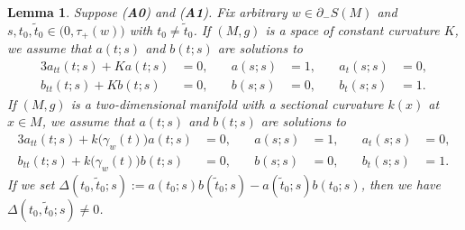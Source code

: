 \documentclass[a4paper,11pt,reqno]{amsart}
\numberwithin{equation}{section}
\newtheorem{lemma}[theorem]{Lemma}
\theoremstyle{definition}
\theoremstyle{remark}
\begin{document}
\begin{lemma}
\label{theorem:noconjugatepoint}
Suppose {\rm ({\bf A0})} and {\rm ({\bf A1})}. 
Fix arbitrary $w \in \partial_-S(M)$ and 
$s,t_0,\tilde{t}_0 \in \bigl(0,\tau_+(w)\bigr)$ 
with $t_0{\ne}\tilde{t}_0$. 
If $(M,g)$ is a space of constant curvature $K$, 
we assume that $a(t;s)$ and $b(t;s)$ are solutions to 
%
%
\begin{alignat}{3}
  a_{tt}(t;s)+Ka(t;s)
& =
  0,
& \quad 
  a(s;s)
& =
  1,
& \quad
  a_t(s;s)
& =
  0,
\label{equation:aK}
\\
  b_{tt}(t;s)+Kb(t;s)
& =
  0,
& \quad 
  b(s;s)
& =
  0,
& \quad
  b_t(s;s)
& =
  1. 
\label{equation:bK}
\end{alignat}
%
%  
If $(M,g)$ is a two-dimensional manifold 
with a sectional curvature $k(x)$ at $x \in M$, 
we assume that $a(t;s)$ and $b(t;s)$ are solutions to 
%
%
\begin{alignat}{3}
  a_{tt}(t;s)+k\bigl(\gamma_w(t)\bigr)a(t;s)
& =
  0,
& \quad 
  a(s;s)
& =
  1,
& \quad
  a_t(s;s)
& =
  0,
\label{equation:akappa}
\\
  b_{tt}(t;s)+k\bigl(\gamma_w(t)\bigr)b(t;s)
& =
  0,
& \quad 
  b(s;s)
& =
  0,
& \quad
  b_t(s;s)
& =
  1. 
\label{equation:bkappa}
\end{alignat}
%
%  
If we set 
$\Delta(t_0,\tilde{t}_0;s):=a(t_0;s)b(\tilde{t}_0;s)-a(\tilde{t}_0;s)b(t_0;s)$, 
then we have $\Delta(t_0,\tilde{t}_0;s)\ne0$.   
\end{lemma}
%
%
\end{document}
